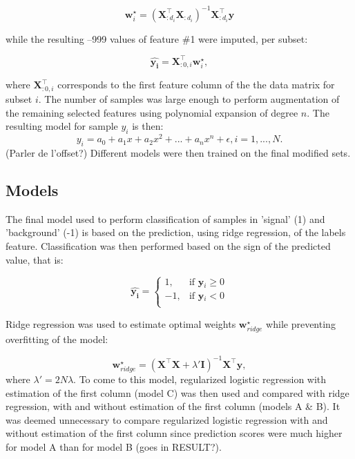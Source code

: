 \documentclass[10pt,conference,compsocconf]{IEEEtran}
\begin{document}
\begin{equation}
    \mathbf{w}^{\star}_i = (\mathbf{X}^{\top}_{:d_i}\mathbf{X}_{:d_i})^{-1}\mathbf{X}^{\top}_{:d_i}\mathbf{y}
\end{equation}

while the resulting --999 values of feature \#1 were imputed, per subset:

\begin{equation}
    \mathbf{\hat{y_i}} = \mathbf{X}^{\top}_{:0,i}\mathbf{w}^{\star}_i,
\end{equation}

where $\mathbf{X}^{\top}_{:0,i}$ corresponds to the first feature column of the the data matrix for subset $i$.
The number of samples was large enough to perform augmentation of the remaining selected features using polynomial expansion of degree $n$. The resulting model for sample $y_i$ is then:
\begin{equation}
y_i = a_0 + a_1x + a_2x^2 + ... + a_nx^n + \epsilon, i = 1, ... ,N.
\end{equation}
(Parler de l'offset?)
Different models were then trained on the final modified sets.

\subsection{Models}

The final model used to perform classification of samples in 'signal' (1) and 'background' (-1) is based on the prediction, using ridge regression, of the labels feature. 
Classification was then performed based on the sign of the predicted value, that is:

\begin{equation}
\mathbf{\hat{y_i}} =  
\begin{cases}
1, &\mbox{if } \mathbf{y}\hat{}_i \ge 0 \\
-1,  & \mbox{if } \mathbf{y}\hat{}_i < 0 \\
\end{cases}
\end{equation}

Ridge regression was used to estimate optimal weights $\mathbf{w}^{\star}_{ridge}$ while preventing overfitting of the model:

\begin{equation}
    \mathbf{w}^{\star}_{ridge} = (\mathbf{X}^{\top}\mathbf{X} + \lambda'\mathbf{I})^{-1}\mathbf{X}^{\top}\mathbf{y},
\end{equation}
where  $\lambda' = 2N\lambda$. To come to this model, regularized logistic regression with estimation of the first column (model C) was then used and compared with ridge regression, with and without estimation of the first column (models A \& B). It was deemed unnecessary to compare regularized logistic regression with and without estimation of the first column since prediction scores were much higher for model A than for model B (goes in RESULT?).
\end{document}
